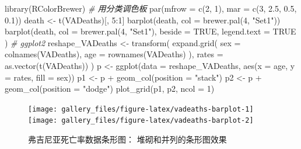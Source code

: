 \documentclass[
  b5paper,
  UTF8,twoside]{book}
\newenvironment{Shaded}{\begin{snugshade}}{\end{snugshade}}
\newcommand{\AttributeTok}[1]{\textcolor[rgb]{0.77,0.63,0.00}{#1}}
\newcommand{\CommentTok}[1]{\textcolor[rgb]{0.56,0.35,0.01}{\textit{#1}}}
\newcommand{\ConstantTok}[1]{\textcolor[rgb]{0.00,0.00,0.00}{#1}}
\newcommand{\DecValTok}[1]{\textcolor[rgb]{0.00,0.00,0.81}{#1}}
\newcommand{\FloatTok}[1]{\textcolor[rgb]{0.00,0.00,0.81}{#1}}
\newcommand{\FunctionTok}[1]{\textcolor[rgb]{0.00,0.00,0.00}{#1}}
\newcommand{\NormalTok}[1]{#1}
\newcommand{\OtherTok}[1]{\textcolor[rgb]{0.56,0.35,0.01}{#1}}
\newcommand{\SpecialCharTok}[1]{\textcolor[rgb]{0.00,0.00,0.00}{#1}}
\newcommand{\StringTok}[1]{\textcolor[rgb]{0.31,0.60,0.02}{#1}}
\begin{document}
\begin{Shaded}
\begin{Highlighting}[]
\FunctionTok{library}\NormalTok{(RColorBrewer) }\CommentTok{\# 用分类调色板}
\FunctionTok{par}\NormalTok{(}\AttributeTok{mfrow =} \FunctionTok{c}\NormalTok{(}\DecValTok{2}\NormalTok{, }\DecValTok{1}\NormalTok{), }\AttributeTok{mar =} \FunctionTok{c}\NormalTok{(}\DecValTok{3}\NormalTok{, }\FloatTok{2.5}\NormalTok{, }\FloatTok{0.5}\NormalTok{, }\FloatTok{0.1}\NormalTok{))}
\NormalTok{death }\OtherTok{\textless{}{-}} \FunctionTok{t}\NormalTok{(VADeaths)[, }\DecValTok{5}\SpecialCharTok{:}\DecValTok{1}\NormalTok{]}
\FunctionTok{barplot}\NormalTok{(death, }\AttributeTok{col =} \FunctionTok{brewer.pal}\NormalTok{(}\DecValTok{4}\NormalTok{, }\StringTok{"Set1"}\NormalTok{))}
\FunctionTok{barplot}\NormalTok{(death,}
  \AttributeTok{col =} \FunctionTok{brewer.pal}\NormalTok{(}\DecValTok{4}\NormalTok{, }\StringTok{"Set1"}\NormalTok{), }\AttributeTok{beside =} \ConstantTok{TRUE}\NormalTok{,}
  \AttributeTok{legend.text =} \ConstantTok{TRUE}
\NormalTok{)}
\CommentTok{\# ggplot2}
\NormalTok{reshape\_VADeaths }\OtherTok{\textless{}{-}} \FunctionTok{transform}\NormalTok{(}
  \FunctionTok{expand.grid}\NormalTok{(}
    \AttributeTok{sex =} \FunctionTok{colnames}\NormalTok{(VADeaths),}
    \AttributeTok{age =} \FunctionTok{rownames}\NormalTok{(VADeaths)}
\NormalTok{  ),}
  \AttributeTok{rates =} \FunctionTok{as.vector}\NormalTok{(}\FunctionTok{t}\NormalTok{(VADeaths))}
\NormalTok{)}
\NormalTok{p }\OtherTok{\textless{}{-}} \FunctionTok{ggplot}\NormalTok{(}\AttributeTok{data =}\NormalTok{ reshape\_VADeaths, }\FunctionTok{aes}\NormalTok{(}\AttributeTok{x =}\NormalTok{ age, }\AttributeTok{y =}\NormalTok{ rates, }\AttributeTok{fill =}\NormalTok{ sex))}
\NormalTok{p1 }\OtherTok{\textless{}{-}}\NormalTok{ p }\SpecialCharTok{+} \FunctionTok{geom\_col}\NormalTok{(}\AttributeTok{position =} \StringTok{"stack"}\NormalTok{)}
\NormalTok{p2 }\OtherTok{\textless{}{-}}\NormalTok{ p }\SpecialCharTok{+} \FunctionTok{geom\_col}\NormalTok{(}\AttributeTok{position =} \StringTok{"dodge"}\NormalTok{)}
\FunctionTok{plot\_grid}\NormalTok{(p1, p2, }\AttributeTok{ncol =} \DecValTok{1}\NormalTok{)}
\end{Highlighting}
\end{Shaded}

\begin{figure}

{\centering \texttt{[image: gallery\_files/figure-latex/vadeaths-barplot-1]} \texttt{[image: gallery\_files/figure-latex/vadeaths-barplot-2]} 

}

\caption[弗吉尼亚死亡率数据条形图]{弗吉尼亚死亡率数据条形图： 堆砌和并列的条形图效果}\label{fig:vadeaths-barplot}
\end{figure}
\end{document}
